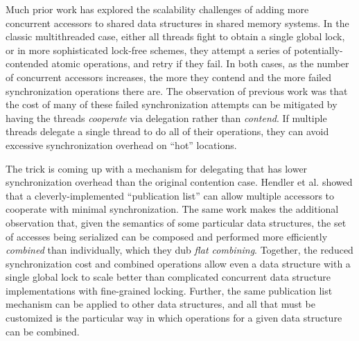 Much prior work has explored the scalability challenges of adding more concurrent accessors to shared data structures in shared memory systems.
In the classic multithreaded case, either all threads fight to obtain a single global lock, or in more sophisticated lock-free schemes, they attempt a series of potentially-contended atomic operations, and retry if they fail. In both cases, as the number of concurrent accessors increases, the more they contend and the more failed synchronization operations there are.
The observation of previous work was that the cost of many of these failed synchronization attempts can be mitigated by having the threads \emph{cooperate} via delegation rather than \emph{contend}.
If multiple threads delegate a single thread to do all of their operations, they can avoid excessive synchronization overhead on ``hot'' locations.

The trick is coming up with a mechanism for delegating that has lower synchronization overhead than the original contention case.
Hendler et al.\cite{flatCombining} showed that a cleverly-implemented ``publication list'' can allow multiple accessors to cooperate with minimal synchronization.
The same work makes the additional observation that, given the semantics of some particular data structures, the set of accesses being serialized can be composed and performed more efficiently \emph{combined} than individually, which they dub \emph{flat combining}.
Together, the reduced synchronization cost and combined operations allow even a data structure with a single global lock to scale better than complicated concurrent data structure implementations with fine-grained locking.
Further, the same publication list mechanism can be applied to other data structures, and all that must be customized is the particular way in which operations for a given data structure can be combined.


